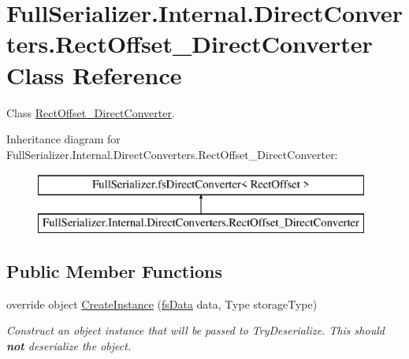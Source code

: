 \hypertarget{class_full_serializer_1_1_internal_1_1_direct_converters_1_1_rect_offset___direct_converter}{}\section{Full\+Serializer.\+Internal.\+Direct\+Converters.\+Rect\+Offset\+\_\+\+Direct\+Converter Class Reference}
\label{class_full_serializer_1_1_internal_1_1_direct_converters_1_1_rect_offset___direct_converter}


Class \hyperlink{class_full_serializer_1_1_internal_1_1_direct_converters_1_1_rect_offset___direct_converter}{Rect\+Offset\+\_\+\+Direct\+Converter}.  


Inheritance diagram for Full\+Serializer.\+Internal.\+Direct\+Converters.\+Rect\+Offset\+\_\+\+Direct\+Converter\+:\begin{figure}[H]
\begin{center}
\leavevmode
\includegraphics[height=2.000000cm]{class_full_serializer_1_1_internal_1_1_direct_converters_1_1_rect_offset___direct_converter}
\end{center}
\end{figure}
\subsection*{Public Member Functions}
\begin{DoxyCompactItemize}
\item 
override object \hyperlink{class_full_serializer_1_1_internal_1_1_direct_converters_1_1_rect_offset___direct_converter_ab4ba48643e3a02b19257a4ab965f6a1d}{Create\+Instance} (\hyperlink{class_full_serializer_1_1fs_data}{fs\+Data} data, Type storage\+Type)
\begin{DoxyCompactList}\small\item\em Construct an object instance that will be passed to Try\+Deserialize. This should {\bfseries not} deserialize the object. \end{DoxyCompactList}\end{DoxyCompactItemize}
